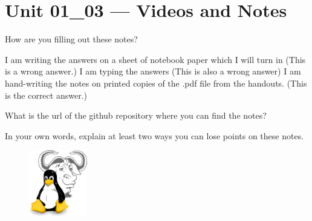 \documentclass[letterpaper,12pt]{exam}
\begin{document}
\section*{Unit 01\_03 --- Videos and Notes} %

\begin{questions}
\question How are you filling out these notes?
\begin{checkboxes}
\choice I am writing the answers on a sheet of notebook paper which I will turn in (This is a wrong answer.)
\choice I am typing the answers (This is also a wrong answer)
\choice I am hand-writing the notes on printed copies of the .pdf file from the handouts. (This is the correct answer.)
\end{checkboxes}

\question What is the url of the github repository where you can find the notes? 
\vspace{1.5cm}

\question In your own words, explain at least two ways you can lose points on these notes. 
\vspace{1.5cm}


\end{questions}

\begin{figure}[b]\label{end}
	\center
	\includegraphics[width=1in]{tux}
	{}
\end{figure}
\end{document}
